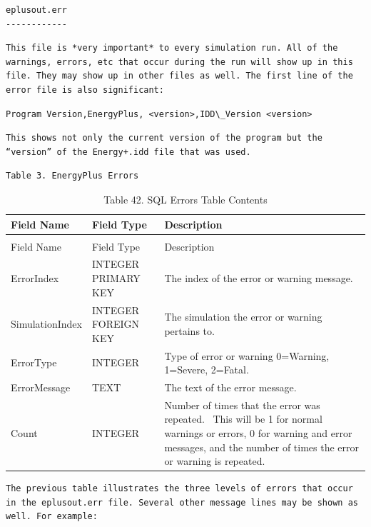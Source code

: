 \begin{lstlisting}
eplusout.err
------------
\end{lstlisting}

\begin{lstlisting}
This file is *very important* to every simulation run. All of the warnings, errors, etc that occur during the run will show up in this file. They may show up in other files as well. The first line of the error file is also significant:
\end{lstlisting}

\begin{lstlisting}
Program Version,EnergyPlus, <version>,IDD\_Version <version>
\end{lstlisting}

\begin{lstlisting}
This shows not only the current version of the program but the “version” of the Energy+.idd file that was used.
\end{lstlisting}

\begin{lstlisting}
Table 3. EnergyPlus Errors
\end{lstlisting}

\begin{longtable}[c]{p{1.5in}p{1.5in}p{2.99in}}
\caption{Table 42. SQL Errors Table Contents \label{table:table-42.-sql-errors-table-contents}} \tabularnewline
\toprule 
Field Name & Field Type & Description \tabularnewline
\midrule
\endfirsthead

\caption[]{Table 42. SQL Errors Table Contents} \tabularnewline
\toprule 
Field Name & Field Type & Description \tabularnewline
\midrule
\endhead

ErrorIndex & INTEGER PRIMARY KEY & The index of the error or warning message. \tabularnewline
SimulationIndex & INTEGER FOREIGN KEY & The simulation the error or warning pertains to. \tabularnewline
ErrorType & INTEGER & Type of error or warning 0=Warning, 1=Severe, 2=Fatal. \tabularnewline
ErrorMessage & TEXT & The text of the error message. \tabularnewline
Count & INTEGER & Number of times that the error was repeated.~ This will be 1 for normal warnings or errors, 0 for warning and error messages, and the number of times the error or warning is repeated. \tabularnewline
\bottomrule
\end{longtable}

\begin{lstlisting}
The previous table illustrates the three levels of errors that occur in the eplusout.err file. Several other message lines may be shown as well. For example:
\end{lstlisting}

